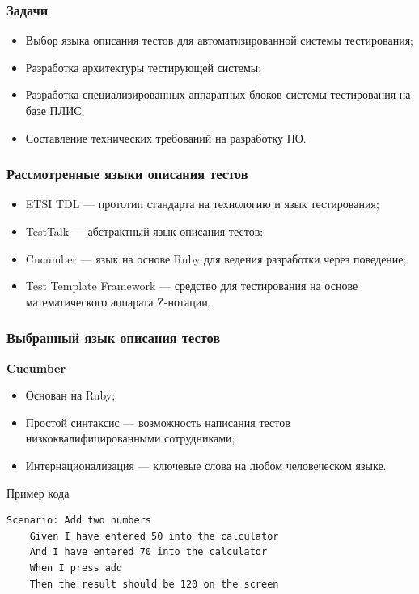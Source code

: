 \documentclass{beamer}
\begin{document}

\begin{frame}
\frametitle{Задачи}
\begin{itemize}
\item Выбор языка описания тестов для автоматизированной системы тестирования;
\item Разработка архитектуры тестирующей системы;
\item Разработка специализированных аппаратных блоков системы тестирования на базе ПЛИС;
\item Составление технических требований на разработку ПО.
\end{itemize}
\end{frame}


\begin{frame}
\frametitle{Рассмотренные языки описания тестов}
\begin{itemize}
\item ETSI TDL --- прототип стандарта на технологию и язык тестирования;
\item TestTalk --- абстрактный язык описания тестов;
\item Cucumber --- язык на основе Ruby для ведения разработки через поведение;
\item Test Template Framework --- средство для тестирования на основе математического аппарата Z-нотации.
\end{itemize}
\end{frame}


\begin{frame}[fragile]
\frametitle{Выбранный язык описания тестов}
\textbf{Cucumber}
\begin{itemize}
\item Основан на Ruby;
\item Простой синтаксис --- возможность написания тестов низкоквалифицированными сотрудниками;
\item Интернационализация --- ключевые слова на любом человеческом языке.
\end{itemize}
\begin{block}{Пример кода}
\begin{verbatim}
Scenario: Add two numbers
    Given I have entered 50 into the calculator
    And I have entered 70 into the calculator
    When I press add
    Then the result should be 120 on the screen
\end{verbatim}
\end{block}
\end{frame}
\end{document}
